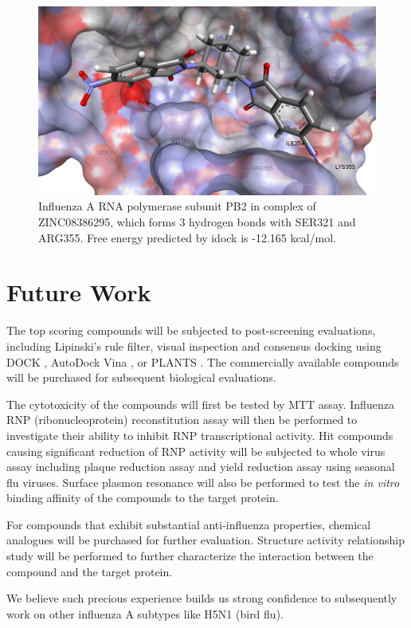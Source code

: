 \begin{figure}
\centering
\includegraphics[width=\linewidth]{../influenza/2VQZ-ZINC08386295.png}
\caption{Influenza A RNA polymerase subunit PB2 in complex of ZINC08386295, which forms 3 hydrogen bonds with SER321 and ARG355. Free energy predicted by idock is -12.165 kcal/mol.}
\label{Case:2VQZ-ZINC08386295}
\end{figure}

\section{Future Work}

The top scoring compounds will be subjected to post-screening evaluations, including Lipinski’s rule filter, visual inspection and consensus docking using DOCK \citep{1222}, AutoDock Vina \citep{595}, or PLANTS \citep{610,607,779}. The commercially available compounds will be purchased for subsequent biological evaluations.

The cytotoxicity of the compounds will first be tested by MTT assay. Influenza RNP (ribonucleoprotein) reconstitution assay will then be performed to investigate their ability to inhibit RNP transcriptional activity. Hit compounds causing significant reduction of RNP activity will be subjected to whole virus assay including plaque reduction assay and yield reduction assay using seasonal flu viruses. Surface plasmon resonance will also be performed to test the \textit{in vitro} binding affinity of the compounds to the target protein. 

For compounds that exhibit substantial anti-influenza properties, chemical analogues will be purchased for further evaluation. Structure activity relationship study will be performed to further characterize the interaction between the compound and the target protein.

We believe such precious experience builds us strong confidence to subsequently work on other influenza A subtypes like H5N1 (bird flu).

\chapterend
